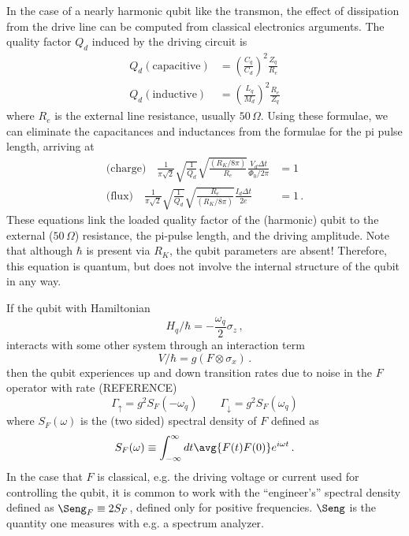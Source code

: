 In the case of a nearly harmonic qubit like the transmon, the effect of dissipation from the drive line can be computed from classical electronics arguments.
The quality factor $Q_d$ induced by the driving circuit is
\begin{align*}
  Q_d (\text{capacitive}) &= \left( \frac{C_q}{C_d} \right)^2 \frac{Z_q}{R_e} \\
  Q_d (\text{inductive}) &= \left( \frac{L_q}{M_d} \right)^2 \frac{R_e}{Z_q}
\end{align*}
where $R_e$ is the external line resistance, usually $50 \, \Omega$.
Using these formulae, we can eliminate the capacitances and inductances from the formulae for the pi pulse length, arriving at
\begin{align*}
  \text{(charge)} \quad
    \frac{1}{\pi\sqrt{2}} \sqrt{\frac{1}{Q_d}}
    \sqrt{\frac{(R_K/8\pi)}{R_e}} \frac{V_d \Delta t}{\Phi_0/2\pi} &= 1 \\
  \text{(flux)} \quad
    \frac{1}{\pi\sqrt{2}} \sqrt{\frac{1}{Q_d}}
    \sqrt{\frac{R_e}{(R_K/8\pi)}} \frac{I_d \Delta t}{2e} &= 1 \, .
\end{align*}
These equations link the loaded quality factor of the (harmonic) qubit to the external ($50 \, \Omega$) resistance, the pi-pulse length, and the driving amplitude.
Note that although $\hbar$ is present via $R_K$, the qubit parameters are absent!
Therefore, this equation is quantum, but does not involve the internal structure of the qubit in any way.


If the qubit with Hamiltonian
\begin{equation*}
  H_q / \hbar = - \frac{\omega_q}{2} \sigma_z \, ,
\end{equation*}
interacts with some other system through an interaction term
\begin{equation*}
  V / \hbar = g(F \otimes \sigma_x) \, .
\end{equation*}
then the qubit experiences up and down transition rates due to noise in the $F$ operator with rate (REFERENCE)
\begin{equation*}
  \Gamma_\uparrow = g^2 S_F(- \omega_q) \qquad \Gamma_\downarrow = g^2 S_F(\omega_q)
\end{equation*}
where $S_F(\omega)$ is the (two sided) spectral density of $F$ defined as
\begin{equation*}
  S_F(\omega) \equiv \int_{-\infty}^\infty dt \avg{F(t) F(0)} e^{i \omega t} \, .
\end{equation*}
In the case that $F$ is classical, e.g. the driving voltage or current used for controlling the qubit, it is common to work with the ``engineer's'' spectral density defined as $\Seng_F \equiv 2 S_F$, defined only for positive frequencies.
$\Seng$ is the quantity one measures with e.g. a spectrum analyzer.

